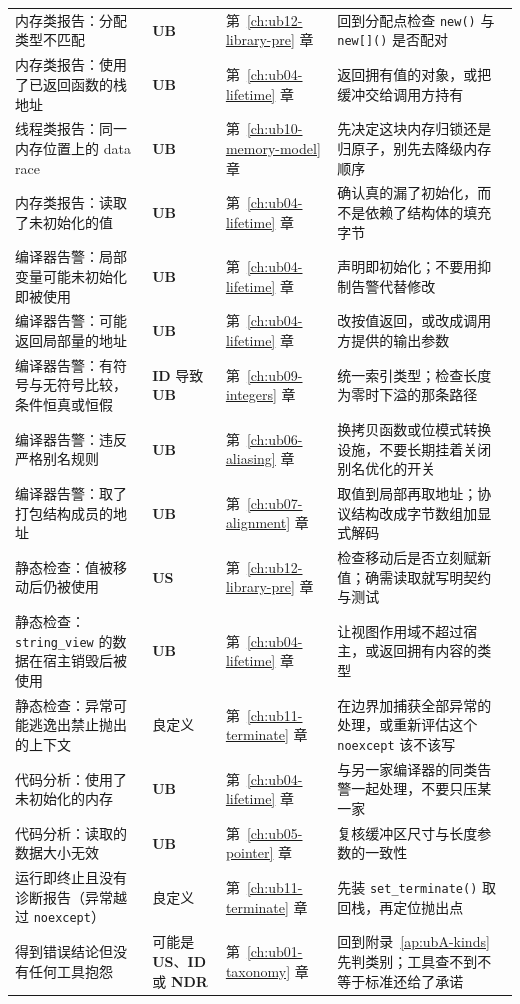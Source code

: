 \documentclass[12pt,a4paper,fontset=fandol]{ctexbook}
\newcommand{\Fn}[1]{\texttt{#1()}}
\newcommand{\Tp}[1]{\texttt{#1}}
\newcommand{\Bk}{\discretionary{}{}{}}
\newcommand{\UB}{\textbf{\textsf{UB}}}
\newcommand{\IDB}{\textbf{\textsf{ID}}}
\newcommand{\USB}{\textbf{\textsf{US}}}
\newcommand{\NDR}{\textbf{\textsf{NDR}}}
\begin{document}
\begin{longtable}{@{}>{\raggedright\arraybackslash}p{} >{\raggedright\arraybackslash}p{} >{\raggedright\arraybackslash}p{} >{\raggedright\arraybackslash}p{}@{}}
内存类报告：分配类型不匹配 & \UB{} & 第~\ref{ch:ub12-library-pre} 章 & 回到分配点检查 \Fn{new} 与 \Fn{new[]} 是否配对 \\
内存类报告：使用了已返回函数的栈地址 & \UB{} & 第~\ref{ch:ub04-lifetime} 章 & 返回拥有值的对象，或把缓冲交给调用方持有 \\
线程类报告：同一内存位置上的 data race & \UB{} & 第~\ref{ch:ub10-memory-model} 章 & 先决定这块内存归锁还是归原子，别先去降级内存顺序 \\
内存类报告：读取了未初始化的值 & \UB{} & 第~\ref{ch:ub04-lifetime} 章 & 确认真的漏了初始化，而不是依赖了结构体的填充字节 \\
编译器告警：局部变量可能未初始化即被使用 & \UB{} & 第~\ref{ch:ub04-lifetime} 章 & 声明即初始化；不要用抑制告警代替修改 \\
编译器告警：可能返回局部量的地址 & \UB{} & 第~\ref{ch:ub04-lifetime} 章 & 改按值返回，或改成调用方提供的输出参数 \\
编译器告警：有符号与无符号比较，条件恒真或恒假 & \IDB{} 导致 \UB{} & 第~\ref{ch:ub09-integers} 章 & 统一索引类型；检查长度为零时下溢的那条路径 \\
编译器告警：违反严格别名规则 & \UB{} & 第~\ref{ch:ub06-aliasing} 章 & 换拷贝函数或位模式转换设施，不要长期挂着关闭别名优化的开关 \\
编译器告警：取了打包结构成员的地址 & \UB{} & 第~\ref{ch:ub07-alignment} 章 & 取值到局部再取地址；协议结构改成字节数组加显式解码 \\
静态检查：值被移动后仍被使用 & \USB{} & 第~\ref{ch:ub12-library-pre} 章 & 检查移动后是否立刻赋新值；确需读取就写明契约与测试 \\
静态检查：\Tp{string{\Bk}\_view} 的数据在宿主销毁后被使用 & \UB{} & 第~\ref{ch:ub04-lifetime} 章 & 让视图作用域不超过宿主，或返回拥有内容的类型 \\
静态检查：异常可能逃逸出禁止抛出的上下文 & 良定义 & 第~\ref{ch:ub11-terminate} 章 & 在边界加捕获全部异常的处理，或重新评估这个 \Tp{noexcept} 该不该写 \\
代码分析：使用了未初始化的内存 & \UB{} & 第~\ref{ch:ub04-lifetime} 章 & 与另一家编译器的同类告警一起处理，不要只压某一家 \\
代码分析：读取的数据大小无效 & \UB{} & 第~\ref{ch:ub05-pointer} 章 & 复核缓冲区尺寸与长度参数的一致性 \\
运行即终止且没有诊断报告（异常越过 \Tp{noexcept}） & 良定义 & 第~\ref{ch:ub11-terminate} 章 & 先装 \Fn{set{\Bk}\_ter{\Bk}minate} 取回栈，再定位抛出点 \\
得到错误结论但没有任何工具抱怨 & 可能是 \USB{}、\IDB{} 或 \NDR{} & 第~\ref{ch:ub01-taxonomy} 章 & 回到附录~\ref{ap:ubA-kinds} 先判类别；工具查不到不等于标准还给了承诺 \\
\end{longtable}
\end{document}
